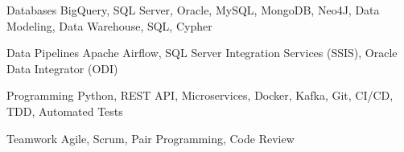 


\begin{cvskills}


\cvskill
{Databases} %
{BigQuery, SQL Server, Oracle, MySQL, MongoDB, Neo4J, Data Modeling, Data Warehouse, SQL, Cypher} %

\cvskill
{Data Pipelines} %
{Apache Airflow, SQL Server Integration Services (SSIS), Oracle Data Integrator (ODI)} %

\cvskill
{Programming} %
{Python, REST API, Microservices, Docker, Kafka, Git, CI/CD, TDD, Automated Tests} %


\cvskill
{Teamwork} %
{Agile, Scrum, Pair Programming, Code Review} %


\end{cvskills}